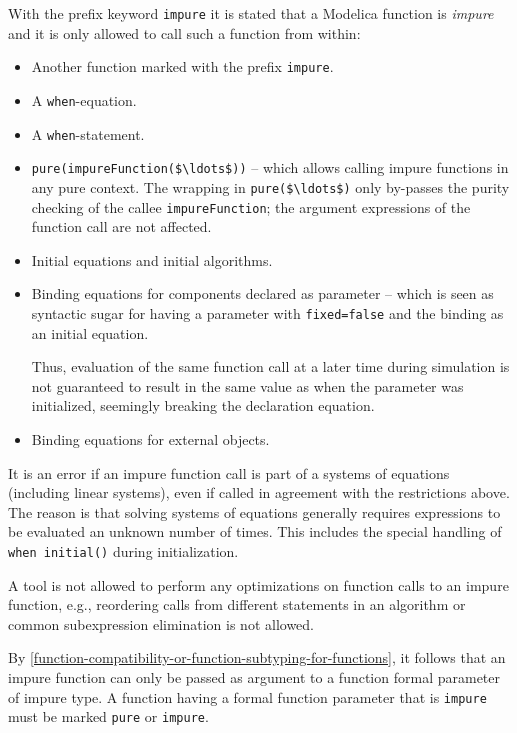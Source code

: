 With the prefix keyword \lstinline!impure! it is stated that a Modelica function is \emph{impure} and it is only allowed to call such a function from within:
\begin{itemize}
\item
  Another function marked with the prefix \lstinline!impure!.
\item
  A \lstinline!when!-equation.
\item
  A \lstinline!when!-statement.
\item
  \lstinline!pure(impureFunction($\ldots$))! -- which allows calling impure functions in any pure context.
  The wrapping in \lstinline!pure($\ldots$)! only by-passes the purity checking of the callee \lstinline!impureFunction!; the argument expressions of the function call are not affected.
\item
  Initial equations and initial algorithms.
\item
  Binding equations for components declared as parameter -- which is seen as syntactic sugar for having a parameter with \lstinline!fixed=false! and the binding as an initial equation.
  \begin{nonnormative}
  Thus, evaluation of the same function call at a later time during simulation is not guaranteed to result in the same value as when the parameter
  was initialized, seemingly breaking the declaration equation.
  \end{nonnormative}
\item
  Binding equations for external objects.
\end{itemize}

It is an error if an impure function call is part of a systems of equations (including linear systems), even if called in agreement with the restrictions above.
The reason is that solving systems of equations generally requires expressions to be evaluated an unknown number of times.
This includes the special handling of \lstinline!when initial()! during initialization.

\begin{nonnormative}
A tool is not allowed to perform any optimizations on function
calls to an impure function, e.g., reordering calls from different
statements in an algorithm or common subexpression elimination is not
allowed.
\end{nonnormative}

By \cref{function-compatibility-or-function-subtyping-for-functions}, it follows that an impure function can only be passed as argument to a function formal parameter of impure type.
A function having a formal function parameter that is \lstinline!impure! must be marked \lstinline!pure! or \lstinline!impure!.

